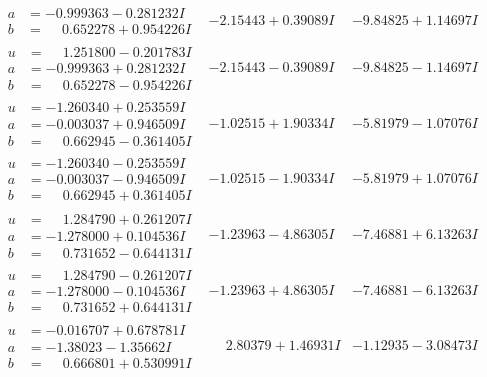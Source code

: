 \documentclass[1p]{elsarticle_modified}
\theoremstyle{definition}
\begin{document}
$$\begin{array}{c|c|c}
\begin{aligned}
a &= -0.999363 - 0.281232 I \\
b &= \phantom{-}0.652278 + 0.954226 I\end{aligned}
 & -2.15443 + 0.39089 I & -9.84825 + 1.14697 I \\ \hline\begin{aligned}
u &= \phantom{-}1.251800 - 0.201783 I \\
a &= -0.999363 + 0.281232 I \\
b &= \phantom{-}0.652278 - 0.954226 I\end{aligned}
 & -2.15443 - 0.39089 I & -9.84825 - 1.14697 I \\ \hline\begin{aligned}
u &= -1.260340 + 0.253559 I \\
a &= -0.003037 + 0.946509 I \\
b &= \phantom{-}0.662945 - 0.361405 I\end{aligned}
 & -1.02515 + 1.90334 I & -5.81979 - 1.07076 I \\ \hline\begin{aligned}
u &= -1.260340 - 0.253559 I \\
a &= -0.003037 - 0.946509 I \\
b &= \phantom{-}0.662945 + 0.361405 I\end{aligned}
 & -1.02515 - 1.90334 I & -5.81979 + 1.07076 I \\ \hline\begin{aligned}
u &= \phantom{-}1.284790 + 0.261207 I \\
a &= -1.278000 + 0.104536 I \\
b &= \phantom{-}0.731652 - 0.644131 I\end{aligned}
 & -1.23963 - 4.86305 I & -7.46881 + 6.13263 I \\ \hline\begin{aligned}
u &= \phantom{-}1.284790 - 0.261207 I \\
a &= -1.278000 - 0.104536 I \\
b &= \phantom{-}0.731652 + 0.644131 I\end{aligned}
 & -1.23963 + 4.86305 I & -7.46881 - 6.13263 I \\ \hline\begin{aligned}
u &= -0.016707 + 0.678781 I \\
a &= -1.38023 - 1.35662 I \\
b &= \phantom{-}0.666801 + 0.530991 I\end{aligned}
 & \phantom{-}2.80379 + 1.46931 I & -1.12935 - 3.08473 I \\ \hline\begin{aligned}

\end{aligned}
\end{array}$$
\end{document}
